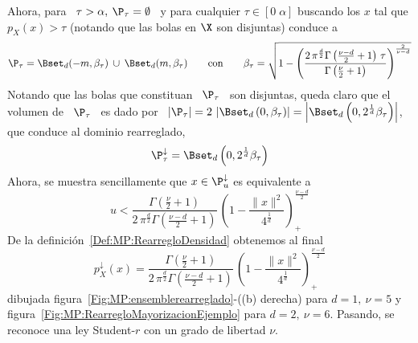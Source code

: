 {\begin{ejemplo}
  Ahora, para \ $\tau > \alpha, \: \P_\tau = \emptyset$ \ y para cualquier $\tau
  \in [0 \; \alpha]$  buscando los $x$ tal que $p_X(x) >  \tau$ (notando que las
  bolas en $\X$ son disjuntas) conduce a
  \[
  \P_\tau = \Bset_d(-m  , \beta_\tau) \: \cup \:  \Bset_d(m , \beta_\tau) \qquad
  \mbox{con} \qquad \beta_\tau = \sqrt{  1 - \left( \frac{2 \, \pi^{\frac{d}{2}}
        \Gamma\left(   \frac{\nu-d}{2}    +1   \right)   \,   \tau}{\Gamma\left(
          \frac{\nu}{2} +1 \right)} \right)^{\frac{2}{\nu-d}}}
  \]
  Notando que las bolas que constituan  \ $\P_\tau$ \ son disjuntas, queda claro
  que el volumen de  \ $\P_\tau$ \ es dado por \ $\left|  \P_\tau \right| = 2 \,
  \left| \Bset_d\left( 0 , \beta_\tau \right) \right| = \left| \Bset_d\left( 0 ,
      2^{\frac{1}{d}}  \beta_\tau  \right)  \right|$,  que  conduce  al  dominio
  rearreglado,
  \[
  \P^{\downarrow}_\tau = \Bset_d\left( 0 , 2^{\frac{1}{d}} \beta_\tau \right)
  \]
  Ahora, se muestra sencillamente que $x \in \P^{\downarrow}_u$ es equivalente a
  \[
  \displaystyle  u   <  \frac{\Gamma\left(  \frac{\nu}{2}  +   1  \right)}{2  \,
    \pi^{\frac{d}{2}} \Gamma\left(  \frac{\nu-d}{2} + 1  \right)} \, \left(  1 -
    \frac{\|x\|^2}{4^{\frac1d}}  \right)_+^{\frac{\nu-d}{2}}
  \]
  De la definici\'on~\ref{Def:MP:RearregloDensidad} obtenemos al final
  \[
  p^{\downarrow}_X(x)  =  \frac{\Gamma\left(  \frac{\nu}{2}  + 1  \right)}{2  \,
    \pi^{\frac{d}{2}} \Gamma\left(  \frac{\nu-d}{2} + 1  \right)} \, \left(  1 -
    \frac{\|x\|^2}{4^{\frac1d}}  \right)_+^{\frac{\nu-d}{2}}
 \]
 dibujada figura~\ref{Fig:MP:ensemblerearreglado}-((b) derecha)  para $d = 1, \:
 \nu = 5$ y figura~\ref{Fig:MP:RearregloMayorizacionEjemplo} para $d = 2, \: \nu
 = 6$. Pasando, se reconoce una ley Student-$r$ con un grado de libertad $\nu$.


\end{ejemplo}}
